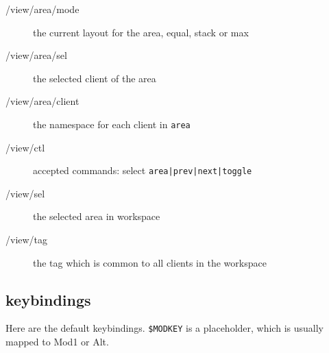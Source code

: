 \documentclass[12pt,a4paper]{article} %
\begin{document}
\begin{description}
    \item [/view/area/mode] the current layout for the area, equal, stack or max
    \item [/view/area/sel] the selected client of the area
    \item [/view/area/client] the namespace for each client in \verb+area+
    \item [/view/ctl] accepted commands: select \verb+area|prev|next|toggle+
    \item [/view/sel] the selected area in workspace
    \item [/view/tag] the tag which is common to all clients in the workspace

    \end{description}

    \newpage

    \subsection{keybindings}
    Here are the default keybindings. \verb+$MODKEY+ is a placeholder, which is
    usually mapped to Mod1 or Alt.
\end{document}
